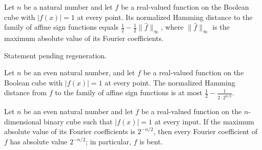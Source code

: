 \begin{theorem}
\label{FABL.distanceToAffineSigns_eq}
\leanok
{}
Let $n$ be a natural number and let $f$ be a real-valued function on the Boolean cube
with $|f(x)|=1$ at every point. Its normalized Hamming distance to the family of affine
sign functions equals $\frac12-\frac12\|\widehat f\|_\infty$, where $\|\widehat
f\|_\infty$ is the maximum absolute value of its Fourier coefficients.
\end{theorem}

\begin{theorem}
\label{FABL.IsBent.spectralInfinityNorm_eq}
\leanok
{}
Statement pending regeneration.
\end{theorem}

\begin{theorem}
\label{FABL.distanceToAffineSigns_le_bentBound}
\leanok
{}
Let $n$ be an even natural number, and let $f$ be a real-valued function on the Boolean
cube with $|f(x)|=1$ at every point. The normalized Hamming distance from $f$ to the
family of affine sign functions is at most $\frac12-\frac{1}{2\cdot 2^{n/2}}$.
\end{theorem}

\begin{theorem}
\label{FABL.isBent_of_spectralInfinityNorm_eq}
\leanok
{}
Let $n$ be an even natural number and let $f$ be a real-valued function on the
$n$-dimensional binary cube such that $|f(x)|=1$ at every input. If the maximum absolute
value of its Fourier coefficients is $2^{-n/2}$, then every Fourier coefficient of $f$
has absolute value $2^{-n/2}$; in particular, $f$ is bent.
\end{theorem}

